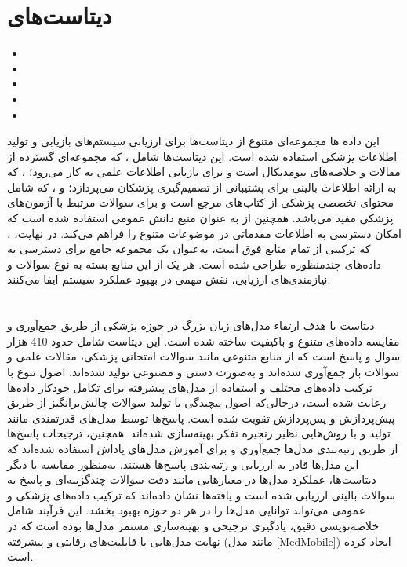 \documentclass[11pt, a4paper, oneside]{book}
\begin{document}
		\section{دیتاست‌های }
			\begin{itemize}
				\item {}
				\item {}
				\item {}
				\item {}
				\item {}
			\end{itemize}
			این داده ها مجموعه‌ای متنوع از دیتاست‌ها برای ارزیابی سیستم‌های بازیابی و تولید اطلاعات پزشکی استفاده شده است. این دیتاست‌ها شامل ، که مجموعه‌ای گسترده از مقالات و خلاصه‌های بیومدیکال است و برای بازیابی اطلاعات علمی به کار می‌رود؛ ، که به ارائه اطلاعات بالینی برای پشتیبانی از تصمیم‌گیری پزشکان می‌پردازد؛ و ، که شامل محتوای تخصصی پزشکی از کتاب‌های مرجع است و برای سوالات مرتبط با آزمون‌های پزشکی مفید می‌باشد. همچنین از  به عنوان منبع دانش عمومی استفاده شده است که امکان دسترسی به اطلاعات مقدماتی در موضوعات متنوع را فراهم می‌کند. در نهایت، ، که ترکیبی از تمام منابع فوق است، به‌عنوان یک مجموعه جامع برای دسترسی به داده‌های چندمنظوره طراحی شده است. هر یک از این منابع بسته به نوع سوالات و نیازمندی‌های ارزیابی، نقش مهمی در بهبود عملکرد  سیستم ایفا می‌کنند. \cite{xiong_benchmarking_2024}
			
		\section{}
			دیتاست  با هدف ارتقاء مدل‌های زبان بزرگ در حوزه پزشکی از طریق جمع‌آوری و مقایسه داده‌های متنوع و باکیفیت ساخته شده است. این دیتاست شامل حدود 410 هزار سوال و پاسخ است که از منابع متنوعی مانند سوالات امتحانی پزشکی، مقالات علمی و سوالات باز جمع‌آوری شده‌اند و به‌صورت دستی و مصنوعی تولید شده‌اند. اصول تنوع با ترکیب داده‌های مختلف و استفاده از مدل‌های پیشرفته برای تکامل خودکار داده‌ها رعایت شده است، درحالی‌که اصول پیچیدگی با تولید سوالات چالش‌برانگیز از طریق پیش‌پردازش و پس‌پردازش تقویت شده است. پاسخ‌ها توسط مدل‌های قدرتمندی مانند  تولید و با روش‌هایی نظیر زنجیره تفکر بهینه‌سازی شده‌اند. همچنین، ترجیحات پاسخ‌ها از طریق رتبه‌بندی مدل‌ها جمع‌آوری و برای آموزش مدل‌های پاداش استفاده شده‌اند که این مدل‌ها قادر به ارزیابی و رتبه‌بندی پاسخ‌ها هستند. به‌منظور مقایسه با دیگر دیتاست‌ها، عملکرد مدل‌ها در معیارهایی مانند دقت سوالات چندگزینه‌ای و پاسخ به سوالات بالینی ارزیابی شده است و یافته‌ها نشان داده‌اند که ترکیب داده‌های پزشکی و عمومی می‌تواند توانایی مدل‌ها را در هر دو حوزه بهبود بخشد. این فرآیند شامل خلاصه‌نویسی دقیق، یادگیری ترجیحی و بهینه‌سازی مستمر مدل‌ها بوده است که در نهایت مدل‌هایی با قابلیت‌های رقابتی و پیشرفته (مانند مدل \ref{MedMobile}) ایجاد کرده است. \cite{zhang_ultramedical_2024}
		
\end{document}
